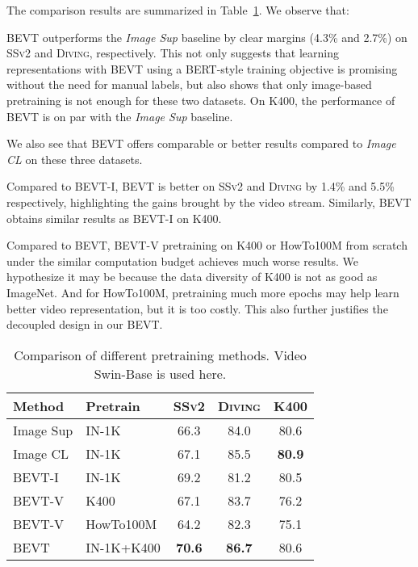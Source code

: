 \documentclass[10pt,twocolumn,letterpaper]{article}
\makeatletter
\newcommand*{\system}{BEVT\@\xspace}
\newcommand{\ssv}{{\scshape SSv2}\xspace}
\newcommand{\diving}{{\scshape Diving\-48}\xspace}
\newcommand{\kn}{{\scshape K400}\xspace}
\newcommand{\ra}[1]{\renewcommand{\arraystretch}{#1}}
\makeatother
\begin{document}
The comparison results are summarized in Table~\ref{tab:pretrain}. We observe that: 
\begin{enumerate*}[label=(\arabic*)]
\item \system outperforms the \emph{Image Sup} baseline by clear margins (4.3\% and 2.7\%) on \ssv and \diving, respectively. This not only suggests that learning representations with \system using a BERT-style training objective is promising without the need for manual labels, but also shows that only image-based pretraining is not enough for these two datasets. On \kn, the performance of \system is on par with the \emph{Image Sup} baseline. 
\item We also see that \system offers comparable or better results compared to \emph{Image CL} on these three datasets. 
\item Compared to \system-I, \system is better on \ssv and \diving by 1.4\% and 5.5\% respectively, highlighting the gains brought by the video stream. Similarly, \system obtains similar results as \system-I on \kn.
\item Compared to \system, \system-V pretraining on \kn or HowTo100M from scratch under the similar computation budget achieves much worse results. We hypothesize it may be because the data diversity of K400 is not as good as ImageNet. And for HowTo100M, pretraining much more epochs may help learn better video representation, but it is too costly. This also further justifies the decoupled design in our \system. 
\end{enumerate*}


\begin{table}[t]
  \centering
  \setlength{\tabcolsep}{0pt} \ra{1.0}
  \begin{tabular*}{\linewidth}{@{\extracolsep{\fill}}llccc@{}}
\toprule
    Method & Pretrain & \ssv & \diving & \kn \\
    \midrule
Image Sup & IN-1K & 66.3 & 84.0 & 80.6 \\
    \midrule
    Image CL & IN-1K & 67.1 & 85.5 & \textbf{80.9} \\
\midrule
    \system-I & IN-1K & 69.2 & 81.2 & 80.5 \\
    \system-V & K400 & 67.1 & 83.7 & 76.2 \\
\system-V & HowTo100M & 64.2 & 82.3 & 75.1 \\
    \midrule
    \system & IN-1K+K400 & \textbf{70.6} & \textbf{86.7} & 80.6 \\
    \bottomrule
  \end{tabular*}
  \caption{Comparison of different pretraining methods. Video Swin-Base is used here.}\label{tab:pretrain}
\end{table}
\end{document}
